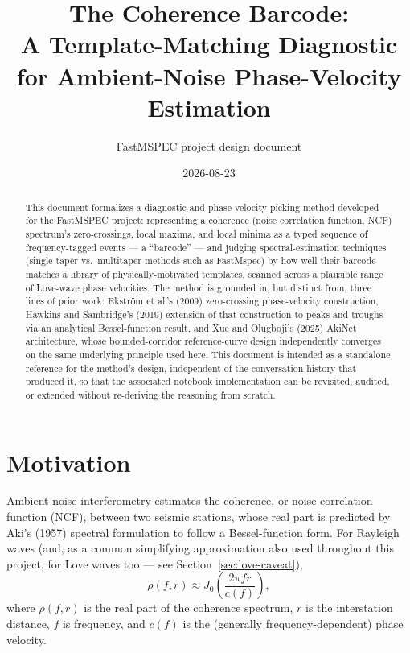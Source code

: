 \documentclass[11pt]{article}
\title{The Coherence Barcode: \\ A Template-Matching Diagnostic for Ambient-Noise Phase-Velocity Estimation}
\author{FastMSPEC project design document}
\date{2026-08-23}
\begin{document}
\maketitle

\begin{abstract}
This document formalizes a diagnostic and phase-velocity-picking method developed for the
FastMSPEC project: representing a coherence (noise correlation function, NCF) spectrum's
zero-crossings, local maxima, and local minima as a typed sequence of frequency-tagged events
--- a ``barcode'' --- and judging spectral-estimation techniques (single-taper vs.\ multitaper
methods such as FastMspec) by how well their barcode matches a library of physically-motivated
templates, scanned across a plausible range of Love-wave phase velocities. The method is grounded
in, but distinct from, three lines of prior work: Ekstr\"om et al.'s (2009) zero-crossing
phase-velocity construction, Hawkins and Sambridge's (2019) extension of that construction to
peaks and troughs via an analytical Bessel-function result, and Xue and Olugboji's (2025) AkiNet
architecture, whose bounded-corridor reference-curve design independently converges on the same
underlying principle used here. This document is intended as a standalone reference for the
method's design, independent of the conversation history that produced it, so that the
associated notebook implementation can be revisited, audited, or extended without re-deriving
the reasoning from scratch.
\end{abstract}

\tableofcontents

\section{Motivation}

Ambient-noise interferometry estimates the coherence, or noise correlation function (NCF),
between two seismic stations, whose real part is predicted by Aki's (1957) spectral formulation
to follow a Bessel-function form. For Rayleigh waves (and, as a common simplifying
approximation also used throughout this project, for Love waves too --- see
Section~\ref{sec:love-caveat}),
\begin{equation}
  \rho(f, r) \approx J_0\!\left(\frac{2\pi f r}{c(f)}\right),
  \label{eq:aki}
\end{equation}
where $\rho(f,r)$ is the real part of the coherence spectrum, $r$ is the interstation distance,
$f$ is frequency, and $c(f)$ is the (generally frequency-dependent) phase velocity.
\end{document}
